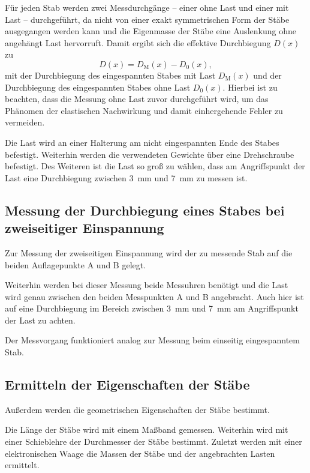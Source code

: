Für jeden Stab werden zwei Messdurchgänge -- einer ohne Last und einer mit Last -- durchgeführt,
da nicht von einer exakt symmetrischen Form der Stäbe ausgegangen werden kann und die Eigenmasse
der Stäbe eine Auslenkung ohne angehängt Last hervorruft.
Damit ergibt sich die effektive Durchbiegung $D(x)$ zu
\begin{equation}
	D(x) = D_{\mathrm{M}}(x) - D_0(x) \mathrm{,}
\end{equation}
mit der Durchbiegung des eingespannten Stabes mit Last $D_{\mathrm{M}}(x)$ und der Durchbiegung
des eingespannten Stabes ohne Last $D_0(x)$.
Hierbei ist zu beachten, dass die Messung ohne Last zuvor durchgeführt wird, um das Phänomen
der elastischen Nachwirkung \cite{V102} und damit einhergehende Fehler zu vermeiden.

Die Last wird an einer Halterung am nicht eingespannten Ende des Stabes befestigt. Weiterhin
werden die verwendeten Gewichte über eine Drehschraube befestigt.
Des Weiteren ist die Last so groß zu wählen, dass am Angriffspunkt der Last eine Durchbiegung
zwischen \SI{3}{\milli\meter} und \SI{7}{\milli\meter} zu messen ist.

\subsection{Messung der Durchbiegung eines Stabes bei zweiseitiger Einspannung}
Zur Messung der zweiseitigen Einspannung wird der zu messende Stab auf die beiden Auflagepunkte
A und B gelegt.

Weiterhin werden bei dieser Messung beide Messuhren benötigt und die Last wird genau zwischen
den beiden Messpunkten A und B angebracht. Auch hier ist auf eine Durchbiegung im Bereich
zwischen \SI{3}{\milli\meter} und \SI{7}{\milli\meter} am Angriffspunkt der Last zu achten.

Der Messvorgang funktioniert analog zur Messung beim einseitig eingespanntem Stab.

\subsection{Ermitteln der Eigenschaften der Stäbe}
Außerdem werden die geometrischen Eigenschaften der Stäbe bestimmt.

Die Länge der Stäbe wird mit einem Maßband gemessen.
Weiterhin wird mit einer Schieblehre%
der Durchmesser der Stäbe bestimmt.
Zuletzt werden mit einer elektronischen Waage die Massen der Stäbe und der angebrachten
Lasten ermittelt.
